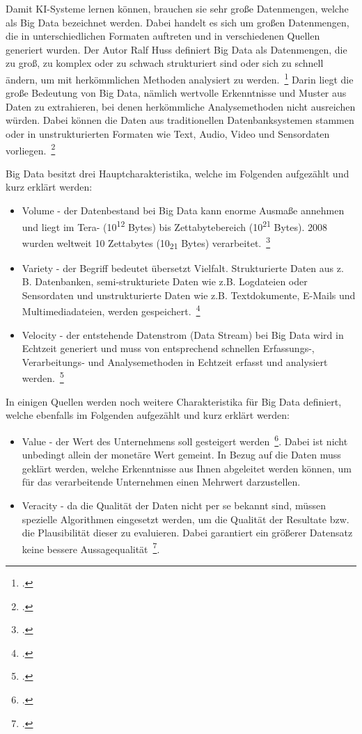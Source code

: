 Damit {KI}-Systeme lernen können, brauchen sie sehr große Datenmengen, welche als Big Data bezeichnet werden. Dabei handelt es sich um großen Datenmengen, die in unterschiedlichen Formaten auftreten
und in verschiedenen Quellen generiert wurden. Der Autor Ralf Huss definiert Big Data als Datenmengen, die zu groß, zu komplex oder zu schwach strukturiert sind oder sich zu schnell ändern, um mit herkömmlichen
Methoden analysiert zu werden.~\footcite[][]{Huss.2019} Darin liegt die große Bedeutung von Big Data, nämlich wertvolle Erkenntnisse und Muster aus Daten zu extrahieren,
bei denen herkömmliche Analysemethoden nicht ausreichen würden. Dabei können die Daten aus traditionellen Datenbanksystemen stammen oder in unstrukturierten Formaten wie Text, Audio, Video und Sensordaten vorliegen.~\footcite[\vglf][]{Fasel.2019}

Big Data besitzt drei Hauptcharakteristika, welche im Folgenden aufgezählt und kurz erklärt werden:

\begin{itemize}
    \item Volume - der Datenbestand bei Big Data kann enorme Ausmaße annehmen und liegt im Tera- (10\textsuperscript{12} Bytes) bis Zettabytebereich (10\textsuperscript{21} Bytes). 2008 wurden weltweit 10 Zettabytes (10\textsubscript{21} Bytes) verarbeitet.~\footcite[\vglf][]{Huss.2019}
    \item Variety - der Begriff bedeutet übersetzt Vielfalt. Strukturierte Daten aus z. B. Datenbanken, semi-strukturiete Daten wie z.B. Logdateien oder Sensordaten und unstrukturierte Daten wie z.B. Textdokumente, E-Mails und Multimediadateien, werden gespeichert.~\footcite[\vglf][]{Fasel.2019}
    \item Velocity - der entstehende Datenstrom (Data Stream) bei Big Data wird in Echtzeit generiert und muss von entsprechend schnellen Erfassungs-, Verarbeitungs- und Analysemethoden in Echtzeit erfasst und analysiert werden.~\footcite[\vglf][]{Fasel.2019}
\end{itemize}


In einigen Quellen werden noch weitere Charakteristika für Big Data definiert, welche ebenfalls im Folgenden aufgezählt und kurz erklärt werden: 

\begin{itemize}
    \item Value - der Wert des Unternehmens soll gesteigert werden~\footcite[\vglf][]{Fasel.2019}. Dabei ist nicht unbedingt allein der monetäre Wert gemeint. In Bezug auf die Daten muss geklärt werden,
    welche Erkenntnisse aus Ihnen abgeleitet werden können, um für das verarbeitende Unternehmen einen Mehrwert darzustellen. 
    \item Veracity - da die Qualität der Daten nicht per se bekannt sind, müssen spezielle Algorithmen eingesetzt werden, um die Qualität der Resultate bzw. die Plausibilität dieser zu evaluieren. Dabei garantiert
 ein größerer Datensatz keine bessere Aussagequalität~\footcite[\vglf][]{Fasel.2019}.
\end{itemize}

